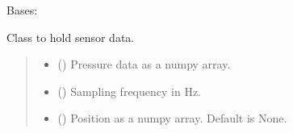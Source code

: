 \documentclass[letterpaper,10pt,english]{sphinxmanual}
\begin{document}
\begin{fulllineitems}
\label{\detokenize{io:amiet_self_noise.io_utils.SensorData}}
\pysigstartsignatures
\pysiglinewithargsret
{}
{\sphinxparamcomma {}\sphinxparamcomma {}}
{}
\pysigstopsignatures
\sphinxAtStartPar
Bases: 

\sphinxAtStartPar
Class to hold sensor data.
\begin{quote}\begin{description}
\begin{itemize}
\item {} 
\sphinxAtStartPar
{} () \textendash{} Pressure data as a numpy array.

\item {} 
\sphinxAtStartPar
{} () \textendash{} Sampling frequency in Hz.

\item {} 
\sphinxAtStartPar
{} (\sphinxstyleliteralemphasis{\sphinxupquote{, }}) \textendash{} Position as a numpy array. Default is None.

\end{itemize}

\end{description}\end{quote}

\begin{fulllineitems}
\label{\detokenize{io:amiet_self_noise.io_utils.SensorData.fs}}
\pysigstartsignatures
\pysigline
{}
\pysigstopsignatures
\end{fulllineitems}


\end{fulllineitems}
\end{document}
